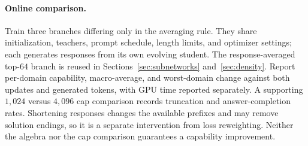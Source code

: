 \paragraph{Online comparison.}
Train three branches differing only in the averaging rule. They share
initialization, teachers, prompt schedule, length limits, and optimizer
settings; each generates responses from its own evolving student.
The response-averaged top-$64$ branch is reused in
Sections~\ref{sec:subnetworks} and~\ref{sec:density}.
Report per-domain capability, macro-average, and worst-domain change
against both updates and generated tokens, with GPU time reported
separately. A supporting $1{,}024$ versus $4{,}096$ cap comparison
records truncation and answer-completion rates. Shortening responses
changes the available prefixes and may remove solution endings, so it
is a separate intervention from loss reweighting. Neither the algebra
nor the cap comparison guarantees a capability improvement.
